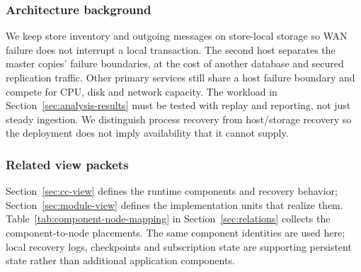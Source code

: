 \subsubsection{Architecture background}
We keep store inventory and outgoing messages on store-local storage so WAN
failure does not interrupt a local transaction. The second \DC host separates the
master copies' failure boundaries, at the cost of another database and secured
replication traffic. Other primary services still share a host failure boundary
and compete for CPU, disk and network capacity. The workload
in Section~\ref{sec:analysis-results} must be tested with replay and reporting,
not just steady ingestion. We distinguish process recovery from host/storage
recovery so the deployment does not imply availability that it cannot supply.

\subsubsection{Related view packets}
Section~\ref{sec:cc-view} defines the runtime components and recovery behavior;
Section~\ref{sec:module-view} defines the implementation units that realize them.
Table~\ref{tab:component-node-mapping} in Section~\ref{sec:relations} collects
the component-to-node placements. The same component
identities are used here; local recovery logs, checkpoints and subscription state
are supporting persistent state rather than additional application components.
